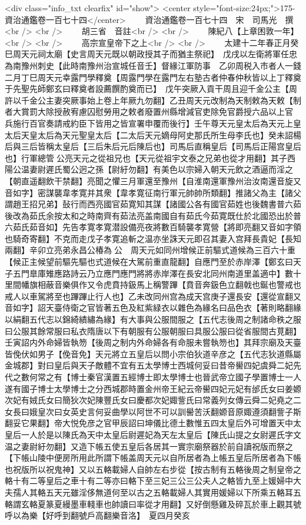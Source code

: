<div class="info_txt clearfix" id="show">
<center style="font-size:24px;">175-資治通鑑卷一百七十四</center>
  　　資治通鑑卷一百七十四　宋　司馬光　撰<br />
<br />
　　胡三省　音註<br />
<br />
　　陳紀八【上章困敦一年】<br />
<br />
　　高宗宣皇帝下之上<br />
<br />
　　太建十二年春正月癸巳周天元祠太廟【史言周天元既以朝政授其子而猶主祭祀】　戊戌以左衛將軍任忠為南豫州刺史【此時南豫州治宣城任音壬】督緣江軍防事　乙卯周税入市者人一錢　二月丁巳周天元幸露門學釋奠【周露門學在露門左右塾古者仲春仲秋皆以上丁釋奠于先聖先師鄭玄曰釋奠者設薦饌酌奠而已】　戊午突厥入貢干周且迎千金公主【周許以千金公主妻突厥事始上卷上年厥九勿翻】乙丑周天元改制為天制敕為天敕【制者大賞罰大除授赦宥慮囚慰勞用之敕者廢置州縣增減官吏除免官爵授六品以上官兵施行百官奏請戒約臣下皆用之皆宣署申覆而後行】壬午尊天元皇太后為天元上皇太后天皇太后為天元聖皇太后【二太后天元嫡母阿史那氏所生母李氏也】癸未詔楊后與三后皆稱太皇后【三后朱后元后陳后也】司馬后直稱皇后【司馬后正陽宫皇后也】行軍總管公亮天元之從祖兄也【天元從祖宇文泰之兄弟也從才用翻】其子西陽公温妻尉遲氏蜀公迥之孫【尉紆勿翻】有美色以宗婦入朝天元飲之酒逼而淫之【朝直遥翻飲干禁翻】亮聞之懼三月軍還至豫州【自淮南還軍豫州治汝南還音旋又音如字】密謀襲韋孝寛并其衆【韋孝寛征南行軍元帥帥所類翻】推諸父為主【諸父謂趙王招兄弟】鼔行而西亮國官茹寛知其謀【諸國公各有國官茹姓也後魏書普六茹後改為茹氏余按太和之時南齊有茹法亮盖南國自有茹氏今茹寛既仕於北國恐出於普六茹氏茹音如】先告孝寛孝寛潜設備亮夜將數百騎襲孝寛營【將即亮翻又音如字領也騎奇寄翻】不克而走戊子孝寛追斬之温亦坐誅天元即召其妻入宫拜長貴妃【長知兩翻】辛卯立亮弟永昌公椿為公　周天元如同州增候正前驅式道候為三百六十重【候正主候望前驅先驅也式道候在大駕前重直龍翻】自應門至於赤岸澤【鄭玄曰天子五門臯庫雉應路詩云乃立應門應門將將赤岸澤在長安北同州南道里盖適中】數十里間幡旗相蔽音樂俱作又令虎賁持鈒馬上稱警蹕【賁音奔鈒色立翻戟也鋋也警戒也戒人以車駕將至也蹕蹕止行人也】乙未改同州宫為成天宫庚子還長安【還從宣翻又音如字】詔天臺侍衛之官皆著五色及紅紫緑衣以雜色為緣名曰品色衣【著則略翻緣以絹翻五代志以錦綺繢繡為緣】有大事與公服間服之【五代志後周之制諸命秩之服曰公服其餘常服曰私衣隋唐以下有朝服有公服朝服曰具服公服曰從省服間古莧翻】壬寅詔内外命婦皆執笏【後周之制内外命婦各有命服未嘗執笏也】其拜宗廟及天臺皆俛伏如男子【俛音免】天元將立五皇后以問小宗伯狄道辛彦之【五代志狄道縣屬金城郡】對曰皇后與天子敵體不宜有五太學博士西城何妥曰昔帝嚳四妃虞舜二妃先代之數何常之有【博士秦官漢置五經博士即太學博士也晉武帝立國子學置博士一人遂有國子博士太學博士之分西城郡時置金州帝王紀云帝嚳四妃元妃有邰氏女曰姜嫄次妃有娀氏女曰簡狄次妃陳豐氏女曰慶都次妃娵訾氏曰常義列女傳云舜二妃堯之二女長曰娥皇次曰女英史言何妥曲學以阿世不可以訓嚳苦沃翻嫄音原娵遵須翻訾子斯翻妥它果翻】帝大悦免彦之官甲辰詔曰坤儀比德土數惟五四太皇后外可增置天中太皇后一人於是以陳氏為天中太皇后尉遲妃為天左太皇后【陳氏山提之女尉遲氏字文温之妻尉紆勿翻】又造下帳五使五皇后各居其一實宗廟祭器於前自讀祝版而祭之【下帳山陵中便房所用此所謂下帳盖周天元以自所居者為上帳五皇后所居者為下帳也祝版所以祝鬼神】又以五輅載婦人自帥左右步從【按古制有五輅後周之制皇帝之輅十有二等皇后之車十有二等亦曰輅下至三妃三公三公夫人之輅皆九至上媛婦中大夫孺人其輅五天元雖淫侈無道何至以古之五輅載婦人其實用媛婦以下所乘五輅耳五輅謂玄輅夏篆夏縵墨車輚車也帥讀曰率從才用翻】又好倒懸雞及碎瓦於車上觀其號呼以為樂【好呼到翻號戶高翻樂音洛】　夏四月癸亥